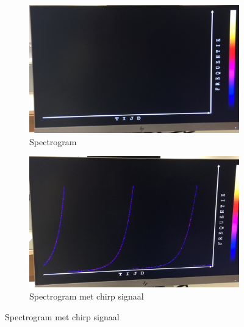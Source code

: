 \documentclass[a4paper,kul]{kulakarticle} %
\begin{document}
\begin{figure}[H]
	\centering
	\begin{subfigure}{.5\textwidth}
		\centering
		\includegraphics[width=0.9\linewidth]{Spectrogram_leeg.jpg}
		\caption{Spectrogram}
		\label{fig:spectrogram_leeg}
	\end{subfigure}%
	\begin{subfigure}{.5\textwidth}
		\centering
		\includegraphics[width=0.9\linewidth]{Spectrogram_chirp.jpg}
		\caption{Spectrogram met chirp signaal}
		\label{fig:spectrogram_chirp}
	\end{subfigure}
	
\end{figure}
\end{document}
